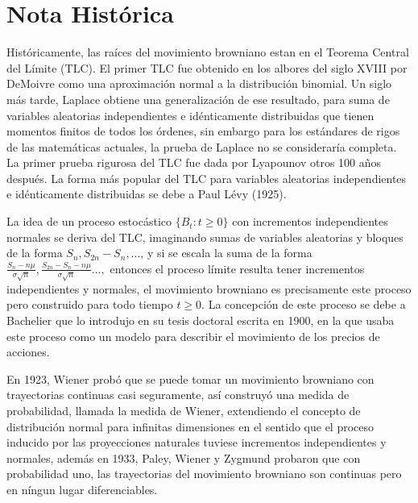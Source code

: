 \documentclass[12pt,oneside]{book}
\numberwithin{equation}{chapter}
\begin{document}
\begingroup
\hypersetup{linkcolor=RobDarkBlue}
\tableofcontents
\endgroup


\pagebreak
\setcounter{page}{1}

\chapter{Nota Histórica}

Históricamente, las raíces del movimiento browniano estan en el Teorema Central del Límite (TLC). El primer TLC fue obtenido en los albores del siglo XVIII por DeMoivre como una aproximación normal a la distribución binomial. Un siglo más tarde, Laplace obtiene una generalización de ese resultado, para suma de variables aleatorias independientes e idénticamente distribuidas que tienen momentos finitos de todos los órdenes, sin embargo para los estándares de rigos de las matemáticas actuales, la prueba de Laplace no se consideraría completa. La primer prueba rigurosa del TLC fue dada por Lyapounov otros 100 años después. La forma más popular del TLC para variables aleatorias independientes e idénticamente distribuidas se debe a Paul Lévy (1925).

La idea de un proceso estocástico $\{B_t:t\geq 0\}$ con incrementos independientes normales se deriva del TLC, imaginando sumas de variables aleatorias y bloques de la forma $S_n,S_{2n}-S_{n},\dots$, y si se escala la suma de la forma $\frac{S_n-n\mu}{\sigma\sqrt{n}},\frac{S_{2n}-S_n-n\mu}{\sigma\sqrt{n}}\dots,$ entonces el proceso límite resulta tener incrementos independientes y normales, el movimiento browniano es precisamente este proceso pero construido para todo tiempo $t\geq 0$. La concepción de este proceso se debe a Bachelier que lo introdujo en su tesis doctoral escrita en 1900, en la que usaba este proceso como un modelo para describir el movimiento de los precios de acciones. 

En 1923, Wiener probó que se puede tomar un movimiento browniano con trayectorias continuas casi seguramente, así construyó una medida de probabilidad, llamada la medida de Wiener, extendiendo el concepto de distribución normal para infinitas dimensiones en el sentido que el proceso inducido por las proyecciones naturales tuviese incrementos independientes y normales, además en 1933, Paley, Wiener y Zygmund probaron que con probabilidad uno, las trayectorias del movimiento browniano son continuas pero en níngun lugar diferenciables. 
\end{document}
